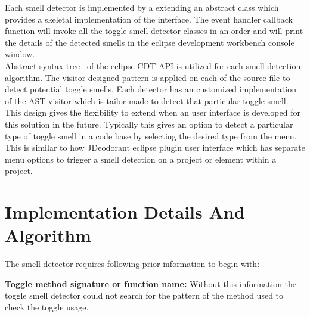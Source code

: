 \documentclass[conference]{IEEEtran}
\begin{document}
Each smell detector is implemented by a extending an abstract class which provides a skeletal implementation of the interface. The event handler callback function will invoke all the toggle smell detector classes in an order and will print the details of the detected smells in the eclipse development workbench console window.\\

Abstract syntax tree~\cite{AbstractSystaxTree} of the eclipse CDT API is utilized for each smell detection algorithm. The visitor designed pattern is applied on each of the source file to detect potential toggle smells. Each detector has an customized implementation of the AST visitor which is tailor made to detect that particular toggle smell. This design gives the flexibility to extend when an user interface is developed for this solution in the future. Typically this gives an option to detect a particular type of toggle smell in a code base by selecting the desired type from the menu. This is similar to how JDeodorant eclipse plugin user interface which has separate menu options to trigger a smell detection on a project or element within a project.

\section{Implementation Details And Algorithm}
\label{Details}
The smell detector requires following prior information to begin with:

\textbf{Toggle method signature or function name:} Without this information the toggle smell detector could not search for the pattern of the method used to check the toggle usage.
\end{document}
